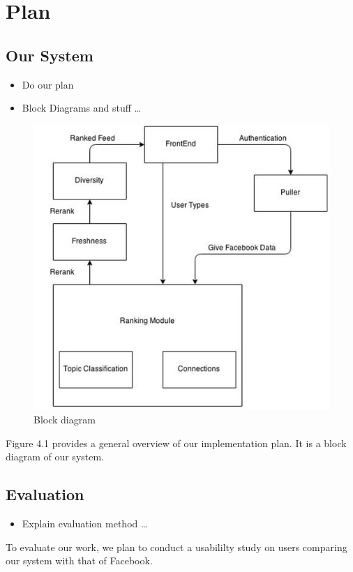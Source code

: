 
\chapter{Plan}\label{ch:plan}


\section{Our System}

\begin{itemize}
  \item Do our plan
  \item Block Diagrams and stuff
\ldots
\end{itemize}

\begin{figure}[bp!]
\centering
\graphicspath{{images/} }
\includegraphics{blockdiagram.jpg}
\caption{Block diagram}
\end{figure}

Figure 4.1 provides a general overview of our implementation plan. It is a block diagram of our system. 

\section {Evaluation}

\begin{itemize}
  \item Explain evaluation method
\ldots
\end{itemize}

To evaluate our work, we plan to conduct a usabililty study on users comparing our system with that of Facebook. 